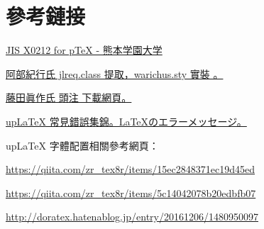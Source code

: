
\section{參考鏈接}

\par\href{http://www2.kumagaku.ac.jp/teacher/herogw/}{JIS X0212 for pTeX - 熊本学園大学}
\par%
\href{http://abenori.blogspot.com/2016/07/warichu-eplatex.html}{阿部紀行氏 jlreq.class 提取，warichus.sty 實裝 。}

\par\href{http://xymtex.com/fujitas2/texlatex/index.html}{藤田眞作氏 頭注 下載網頁。}


\par%

\href{https://texwiki.texjp.org/?LaTeX%20%E3%81%AE%E3%82%A8%E3%83%A9%E3%83%BC%E3%83%A1%E3%83%83%E3%82%BB%E3%83%BC%E3%82%B8}{{up\LaTeX} 常見錯誤集錦。\LaTeX のエラーメッセージ。}

\par%
{up\LaTeX} 字體配置相關參考網頁：
\par\url{https://qiita.com/zr_tex8r/items/15ec2848371ec19d45ed}
\par\url{https://qiita.com/zr_tex8r/items/5c14042078b20edbfb07}
\par\url{http://doratex.hatenablog.jp/entry/20161206/1480950097}

\endinput